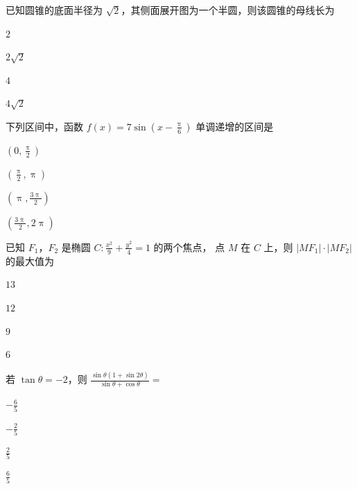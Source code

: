 \documentclass{exam-zh}
\begin{document}
\begin{question}
  已知圆锥的底面半径为 $\sqrt{2}$，其侧面展开图为一个半圆，则该圆锥的母线长为 \paren
  \begin{choices}
    \item $2$
    \item $2 \sqrt{2}$
    \item $4$
    \item $4 \sqrt{2}$
  \end{choices}
\end{question}

\begin{question}
  下列区间中，函数 $f(x) = 7 \sin \left( x - \frac{\uppi}{6} \right)$ 单调递增的区间是 \paren
  \begin{choices}
    \item $\left( 0               , \frac{\uppi}{2}  \right)$
    \item $\left( \frac{\uppi}{2} , \uppi            \right)$
    \item $\left( \uppi           , \frac{3\uppi}{2} \right)$
    \item $\left( \frac{3\uppi}{2}, 2\uppi           \right)$
  \end{choices}
\end{question}

\begin{question}
  已知 $F_1$，$F_2$ 是椭圆 $C \colon \frac{x^2}{9} + \frac{y^2}{4} = 1$ 的两个焦点，
  点 $M$ 在 $C$ 上，则 $|M F_1| \cdot |M F_2|$ 的最大值为 \paren
  \begin{choices}
    \item $13$
    \item $12$
    \item $9$
    \item $6$
  \end{choices}
\end{question}

\begin{question}
  若 $\tan\theta = -2$，则 $\frac{\sin\theta (1 + \sin 2\theta)}{\sin\theta + \cos\theta} = $ \paren
  \begin{choices}
    \item $-\frac{6}{5}$
    \item $-\frac{2}{5}$
    \item $\frac{2}{5}$
    \item $\frac{6}{5}$
  \end{choices}
\end{question}
\end{document}
